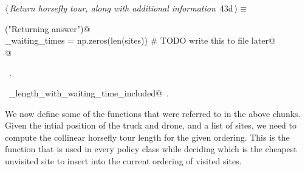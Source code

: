 \documentclass[11.5pt]{report}
\begin{document}
\begin{flushleft} \small\label{scrap64}\raggedright\small
{} $\langle\,${\itshape Return horsefly tour, along with additional information}\nobreak\ {\footnotesize {43d}}$\,\rangle\equiv$
\vspace{-1ex}
\begin{list}{}{} \item
\mbox{}\verb@debug("Returning answer")@\\
\mbox{}\verb@horse_waiting_times = np.zeros(len(sites)) # TODO write this to file later@\\
\mbox{}@\\
\mbox{}\verb@@{\NWsep}
\end{list}
\vspace{-1.5ex}
\footnotesize
\begin{list}{}{\setlength{\itemsep}{-\parsep}\setlength{\itemindent}{-\leftmargin}}
\item \NWtxtMacroRefIn\ .
\item \NWtxtIdentsUsed\nobreak\  \verb@tour_length_with_waiting_time_included@\nobreak\ .
\item{}
\end{list}
\vspace{4ex}
\end{flushleft}

\vspace{-0.8cm}\newchunk We now define some of the functions that were referred to in the above chunks. 
Given the intial position of the truck and drone, and a list of sites, we need to compute 
the collinear horsefly tour length for the given ordering. This is the function that is 
used in every policy class while deciding which is the cheapest unvisited site to insert 
into the current ordering of visited sites. 
\end{document}
